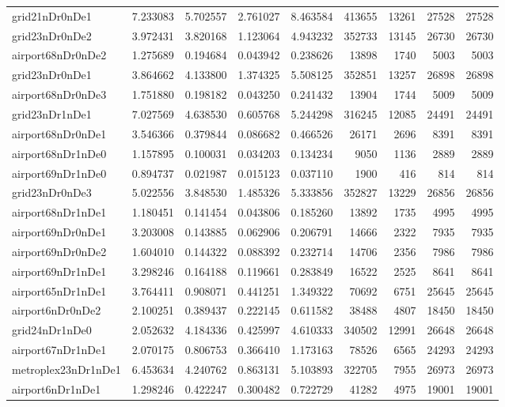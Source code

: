 \begin{longtable}{|l|r|r|r|r|r|r|r|r|}
grid21nDr0nDe1 & 7.233083 & 5.702557 & 2.761027 & 8.463584 & 413655 & 13261 & 27528 & 27528 \\
grid23nDr0nDe2 & 3.972431 & 3.820168 & 1.123064 & 4.943232 & 352733 & 13145 & 26730 & 26730 \\
airport68nDr0nDe2 & 1.275689 & 0.194684 & 0.043942 & 0.238626 & 13898 & 1740 & 5003 & 5003 \\
grid23nDr0nDe1 & 3.864662 & 4.133800 & 1.374325 & 5.508125 & 352851 & 13257 & 26898 & 26898 \\
airport68nDr0nDe3 & 1.751880 & 0.198182 & 0.043250 & 0.241432 & 13904 & 1744 & 5009 & 5009 \\
grid23nDr1nDe1 & 7.027569 & 4.638530 & 0.605768 & 5.244298 & 316245 & 12085 & 24491 & 24491 \\
airport68nDr0nDe1 & 3.546366 & 0.379844 & 0.086682 & 0.466526 & 26171 & 2696 & 8391 & 8391 \\
airport68nDr1nDe0 & 1.157895 & 0.100031 & 0.034203 & 0.134234 & 9050 & 1136 & 2889 & 2889 \\
airport69nDr1nDe0 & 0.894737 & 0.021987 & 0.015123 & 0.037110 & 1900 & 416 & 814 & 814 \\
grid23nDr0nDe3 & 5.022556 & 3.848530 & 1.485326 & 5.333856 & 352827 & 13229 & 26856 & 26856 \\
airport68nDr1nDe1 & 1.180451 & 0.141454 & 0.043806 & 0.185260 & 13892 & 1735 & 4995 & 4995 \\
airport69nDr0nDe1 & 3.203008 & 0.143885 & 0.062906 & 0.206791 & 14666 & 2322 & 7935 & 7935 \\
airport69nDr0nDe2 & 1.604010 & 0.144322 & 0.088392 & 0.232714 & 14706 & 2356 & 7986 & 7986 \\
airport69nDr1nDe1 & 3.298246 & 0.164188 & 0.119661 & 0.283849 & 16522 & 2525 & 8641 & 8641 \\
airport65nDr1nDe1 & 3.764411 & 0.908071 & 0.441251 & 1.349322 & 70692 & 6751 & 25645 & 25645 \\
airport6nDr0nDe2 & 2.100251 & 0.389437 & 0.222145 & 0.611582 & 38488 & 4807 & 18450 & 18450 \\
grid24nDr1nDe0 & 2.052632 & 4.184336 & 0.425997 & 4.610333 & 340502 & 12991 & 26648 & 26648 \\
airport67nDr1nDe1 & 2.070175 & 0.806753 & 0.366410 & 1.173163 & 78526 & 6565 & 24293 & 24293 \\
metroplex23nDr1nDe1 & 6.453634 & 4.240762 & 0.863131 & 5.103893 & 322705 & 7955 & 26973 & 26973 \\
airport6nDr1nDe1 & 1.298246 & 0.422247 & 0.300482 & 0.722729 & 41282 & 4975 & 19001 & 19001 \\

\end{longtable}
